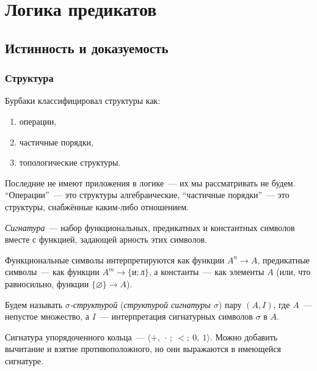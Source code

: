 \documentclass[a4paper,11pt]{article}
\begin{document}
\maketitle

\tableofcontents

\section{Логика предикатов}

\subsection{Истинность и доказуемость}

\subsubsection{Структура}

Бурбаки классифицировал структуры как:
\begin{enumerate}[itemsep=-1.4mm]
	\item операции,
	\item частичные порядки,
	\item топологические структуры.
\end{enumerate}

Последние не имеют приложения в логике~— их мы рассматривать не будем. “Операции”~— это структуры алгебраические, “частичные порядки”~— это структуры, снабжённые каким-либо отношением.

\begin{definition}
	\emph{Сигнатура}~— набор функциональных, предикатных и константных символов вместе с функцией, задающей арность этих символов.

	Функциональные символы интерпретируются как функции $A^n \to A$, предикатные символы~— как функции $A^m \to \{\text{и}; \text{л}\}$, а константы~— как элементы $A$ (или, что равносильно, функции $\{\varnothing\} \to A$).

	Будем называть \emph{$\sigma$-структурой} (\emph{структурой сигнатуры $\sigma$}) пару $(A, I)$, где $A$~— непустое множество, а $I$~— интерпретация сигнатурных символов $\sigma$ в $A$.
\end{definition}

\begin{exmpl}
	Сигнатура упорядоченного кольца~— $\langle {+},\ {\cdot}\,;\ {<};\ 0,\ 1 \rangle$. Можно добавить вычитание и взятие противоположного, но они выражаются в имеющейся сигнатуре.
\end{exmpl}
\end{document}
